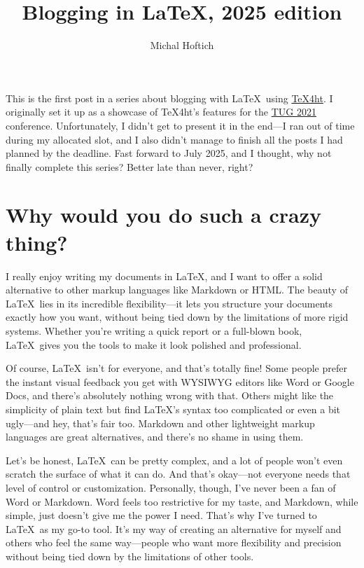 \documentclass{article}
\title{Blogging in LaTeX, 2025 edition}
\author{Michal Hoftich}
\begin{document}
\maketitle


This is the first post in a series about blogging with \LaTeX\ using
\href{https://tug.org/tex4ht/}{\TeX4ht}. I originally set it up as a showcase
of \TeX4ht’s features for the \href{https://tug.org/tug2021/}{TUG 2021}
conference. Unfortunately, I didn’t get to present it in the end—I ran out of
time during my allocated slot, and I also didn’t manage to finish all the posts
I had planned by the deadline. Fast forward to July 2025, and I thought,
why not finally complete this series? Better late than never, right?


\tableofcontents

\section{Why would you do such a crazy thing?}


I really enjoy writing my documents in \LaTeX, and I want to offer a solid
alternative to other markup languages like Markdown or HTML. The beauty of
\LaTeX\ lies in its incredible flexibility—it lets you structure your documents
exactly how you want, without being tied down by the limitations of more rigid
systems. Whether you're writing a quick report or a full-blown book, \LaTeX\
gives you the tools to make it look polished and professional.

Of course, \LaTeX\ isn’t for everyone, and that’s totally fine! Some people
prefer the instant visual feedback you get with WYSIWYG editors like Word or
Google Docs, and there’s absolutely nothing wrong with that. Others might like
the simplicity of plain text but find \LaTeX’s syntax too complicated or even a
bit ugly—and hey, that’s fair too. Markdown and other lightweight markup
languages are great alternatives, and there’s no shame in using them.

Let’s be honest, \LaTeX\ can be pretty complex, and a lot of people won’t even
scratch the surface of what it can do. And that’s okay—not everyone needs that
level of control or customization. Personally, though, I’ve never been a fan of
Word or Markdown. Word feels too restrictive for my taste, and Markdown, while
simple, just doesn’t give me the power I need. That’s why I’ve turned to
\LaTeX\ as my go-to tool. It’s my way of creating an alternative for myself and
others who feel the same way—people who want more flexibility and precision
without being tied down by the limitations of other tools.
\end{document}
